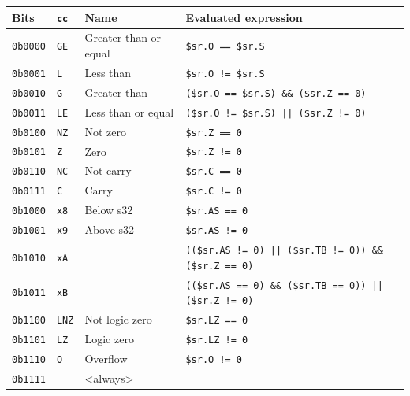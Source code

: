 \documentclass[oneside,english,a4paper,10pt,oneside,openany,final]{memoir}
\newcommand{\Code}[1]{\texttt{#1}}
\begin{document}
\begin{table}[H]
\centering
\begin{tabular}{|l|l|l|l|}
\hline
\textbf{Bits} & \textbf{\texttt{cc}} & \textbf{Name}                & \textbf{Evaluated expression} \\ \hline
\texttt{0b0000}       & \texttt{GE}  & Greater than or equal        & \Code{\$sr.O == \$sr.S}       \\ \hline
\texttt{0b0001}       & \texttt{L}   & Less than                    & \Code{\$sr.O != \$sr.S}       \\ \hline
\texttt{0b0010}       & \texttt{G}   & Greater than                 & \Code{(\$sr.O == \$sr.S) \&\& (\$sr.Z == 0)} \\ \hline
\texttt{0b0011}       & \texttt{LE}  & Less than or equal           & \Code{(\$sr.O != \$sr.S)  ||  (\$sr.Z != 0)} \\ \hline
\texttt{0b0100}       & \texttt{NZ}  & Not zero                     & \Code{\$sr.Z == 0}            \\ \hline
\texttt{0b0101}       & \texttt{Z}   & Zero                         & \Code{\$sr.Z != 0}            \\ \hline
\texttt{0b0110}       & \texttt{NC}  & Not carry                    & \Code{\$sr.C == 0}            \\ \hline
\texttt{0b0111}       & \texttt{C}   & Carry                        & \Code{\$sr.C != 0}            \\ \hline
\texttt{0b1000}       & \texttt{x8}  & Below s32                    & \Code{\$sr.AS == 0}           \\ \hline
\texttt{0b1001}       & \texttt{x9}  & Above s32                    & \Code{\$sr.AS != 0}           \\ \hline
\texttt{0b1010}       & \texttt{xA}  &                              & \Code{((\$sr.AS != 0)  ||  (\$sr.TB != 0)) \&\& (\$sr.Z == 0)} \\ \hline
\texttt{0b1011}       & \texttt{xB}  &                              & \Code{((\$sr.AS == 0) \&\& (\$sr.TB == 0))  ||  (\$sr.Z != 0)} \\ \hline
\texttt{0b1100}       & \texttt{LNZ} & Not logic zero               & \Code{\$sr.LZ == 0}           \\ \hline
\texttt{0b1101}       & \texttt{LZ}  & Logic zero                   & \Code{\$sr.LZ != 0}           \\ \hline
\texttt{0b1110}       & \texttt{O}   & Overflow                     & \Code{\$sr.O != 0}            \\ \hline
\texttt{0b1111}       &              & \textless always\textgreater &                               \\ \hline
\end{tabular}
\end{table}
\end{document}
